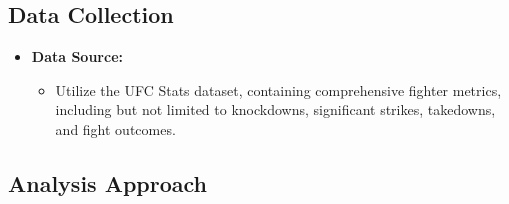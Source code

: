 \documentclass[
  man,floatsintext]{apa6}
\providecommand{\tightlist}{%
  \setlength{\itemsep}{0pt}\setlength{\parskip}{0pt}}
\begin{document}
\hypertarget{data-collection}{%
\subsection{Data Collection}\label{data-collection}}

\begin{itemize}
\tightlist
\item
  \textbf{Data Source:}

  \begin{itemize}
  \tightlist
  \item
    Utilize the UFC Stats dataset, containing comprehensive fighter metrics, including but not limited to knockdowns, significant strikes, takedowns, and fight outcomes.
  \end{itemize}
\end{itemize}

\hypertarget{analysis-approach}{%
\subsection{Analysis Approach}\label{analysis-approach}}
\end{document}

